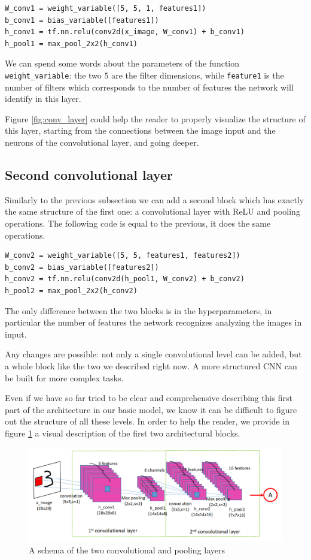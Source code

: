 \begin{lstlisting}
W_conv1 = weight_variable([5, 5, 1, features1])
b_conv1 = bias_variable([features1])
h_conv1 = tf.nn.relu(conv2d(x_image, W_conv1) + b_conv1)
h_pool1 = max_pool_2x2(h_conv1)
\end{lstlisting}

We can spend some words about the parameters of the function \lstinline|weight_variable|: the two $5$ are the filter dimensions, while \lstinline|feature1| is the number of filters which corresponds to the number of features the network will identify in this layer.

Figure \ref{fig:conv_layer} could help the reader to properly visualize the structure of this layer, starting from the connections between the image input and the neurons of the convolutional layer, and going deeper.

\subsection{Second convolutional layer}

Similarly to the previous subsection we can add a second block which has exactly the same structure of the first one: a convolutional layer with \acs{ReLU} and pooling operations. The following code is equal to the previous, it does the same operations.

\begin{lstlisting}
W_conv2 = weight_variable([5, 5, features1, features2])
b_conv2 = bias_variable([features2])
h_conv2 = tf.nn.relu(conv2d(h_pool1, W_conv2) + b_conv2)
h_pool2 = max_pool_2x2(h_conv2)
\end{lstlisting}

The only difference between the two blocks is in the hyperparameters, in particular the number of features the network recognizes analyzing the images in input.

Any changes are possible: not only a single convolutional level can be added, but a whole block like the two we described right now. A more structured \acs{CNN} can be built for more complex tasks.

Even if we have so far tried to be clear and comprehensive describing this first part of the architecture in our basic model, we know it can be difficult to figure out the structure of all these levels. In order to help the reader, we provide in figure \ref{fig:conv_layers} a visual description of the first two architectural blocks.

\begin{figure}
	\centering
	\includegraphics[width=1\textwidth]{Images/conv_layers}
	\caption{A schema of the two convolutional and pooling layers}
	\label{fig:conv_layers}
\end{figure}

